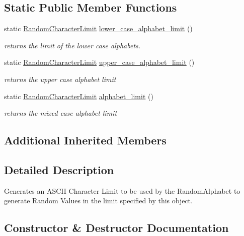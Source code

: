 \subsection*{Static Public Member Functions}
\begin{DoxyCompactItemize}
\item 
static \mbox{\hyperlink{structtestcaser_1_1maker_1_1RandomCharacterLimit}{Random\+Character\+Limit}} \mbox{\hyperlink{structtestcaser_1_1maker_1_1RandomCharacterLimit_ae6e40c00b9225a88b0133c17d4b24f90}{lower\+\_\+case\+\_\+alphabet\+\_\+limit}} ()
\begin{DoxyCompactList}\small\item\em returns the limit of the lower case alphabets. \end{DoxyCompactList}\item 
static \mbox{\hyperlink{structtestcaser_1_1maker_1_1RandomCharacterLimit}{Random\+Character\+Limit}} \mbox{\hyperlink{structtestcaser_1_1maker_1_1RandomCharacterLimit_a7a0ee0690e97a27402faca09c6044aed}{upper\+\_\+case\+\_\+alphabet\+\_\+limit}} ()
\begin{DoxyCompactList}\small\item\em returns the upper case alphabet limit \end{DoxyCompactList}\item 
static \mbox{\hyperlink{structtestcaser_1_1maker_1_1RandomCharacterLimit}{Random\+Character\+Limit}} \mbox{\hyperlink{structtestcaser_1_1maker_1_1RandomCharacterLimit_a4519263daf2737941039054c60c26ca5}{alphabet\+\_\+limit}} ()
\begin{DoxyCompactList}\small\item\em returns the mixed case alphabet limit \end{DoxyCompactList}\end{DoxyCompactItemize}
\subsection*{Additional Inherited Members}


\subsection{Detailed Description}
Generates an A\+S\+C\+II Character Limit to be used by the Random\+Alphabet to generate Random Values in the limit specified by this object. 



\subsection{Constructor \& Destructor Documentation}
\mbox{\label{structtestcaser_1_1maker_1_1RandomCharacterLimit_a2ebd894bf7f536219bf7a917ed036c55}} 
